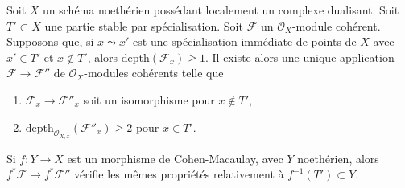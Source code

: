 \begin{lemma}
\label{lemma-make-S2-along-T-simple}
Soit $X$ un schéma noethérien possédant localement un complexe dualisant. Soit $T' \subset X$ une partie stable par spécialisation. Soit $\mathcal{F}$ un $\mathcal{O}_X$-module cohérent. Supposons que, si $x \leadsto x'$ est une spécialisation immédiate de points de $X$ avec $x' \in T'$ et $x \not \in T'$, alors $\text{depth}(\mathcal{F}_x) \geq 1$. Il existe alors une unique application $\mathcal{F} \to \mathcal{F}''$ de $\mathcal{O}_X$-modules cohérents telle que
\begin{enumerate}
\item $\mathcal{F}_x \to \mathcal{F}''_x$ soit un isomorphisme pour $x \not \in T'$,
\item $\text{depth}_{\mathcal{O}_{X, x}}(\mathcal{F}''_x) \geq 2$ pour $x \in T'$.
\end{enumerate}
Si $f : Y \to X$ est un morphisme de Cohen-Macaulay, avec $Y$ noethérien, alors $f^*\mathcal{F} \to f^*\mathcal{F}''$ vérifie les mêmes propriétés relativement à $f^{-1}(T') \subset Y$.
\end{lemma}

